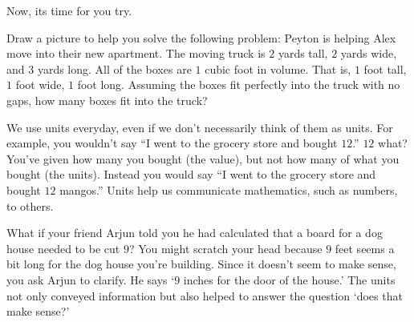 \documentclass{ximera}
\begin{document}
Now, its time for you try.

\begin{exploration}
Draw a picture to help you solve the following problem: Peyton is helping Alex move into their new apartment. The moving truck is $2$ yards tall, $2$ yards wide, and $3$ yards long. All of the boxes are $1$ cubic foot in volume.  That is, $1$ foot tall, $1$ foot wide, $1$ foot long. Assuming the boxes fit perfectly into the truck with no gaps, how many boxes fit into the truck?
\end{exploration}










We use units everyday, even if we don't necessarily think of them as units.  For example, you wouldn't say ``I went to the grocery store and bought $12$.''  $12$ what?  You've given how many you bought (the value), but not how many of what you bought (the units).  Instead you would say ``I went to the grocery store and bought $12$ mangos.'' Units help us communicate mathematics, such as numbers, to others.

What if your friend Arjun told you he had calculated that a board for a dog house needed to be cut $9$? You might scratch your head because $9$ feet seems a bit long for the dog house you're building. Since it doesn't seem to make sense, you ask Arjun to clarify. He says `$9$ inches for the door of the house.' The units not only conveyed information but also helped to answer the question `does that make sense?'
\end{document}
